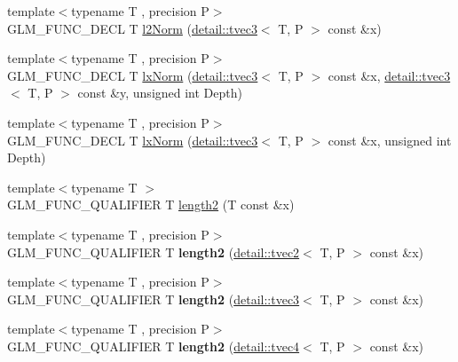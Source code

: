 \begin{DoxyCompactItemize}
\item 
{\footnotesize template$<$typename T , precision P$>$ }\\G\+L\+M\+\_\+\+F\+U\+N\+C\+\_\+\+D\+E\+CL T \hyperlink{group__gtx__norm_gacdfd8d645b91db95a191a1294226571b}{l2\+Norm} (\hyperlink{structglm_1_1detail_1_1tvec3}{detail\+::tvec3}$<$ T, P $>$ const \&x)
\item 
{\footnotesize template$<$typename T , precision P$>$ }\\G\+L\+M\+\_\+\+F\+U\+N\+C\+\_\+\+D\+E\+CL T \hyperlink{group__gtx__norm_gaf2ec2a2b14e0d4ddfadd5b1a98ed9799}{lx\+Norm} (\hyperlink{structglm_1_1detail_1_1tvec3}{detail\+::tvec3}$<$ T, P $>$ const \&x, \hyperlink{structglm_1_1detail_1_1tvec3}{detail\+::tvec3}$<$ T, P $>$ const \&y, unsigned int Depth)
\item 
{\footnotesize template$<$typename T , precision P$>$ }\\G\+L\+M\+\_\+\+F\+U\+N\+C\+\_\+\+D\+E\+CL T \hyperlink{group__gtx__norm_ga7f76252fa0266db34865dba8a8c0f7d6}{lx\+Norm} (\hyperlink{structglm_1_1detail_1_1tvec3}{detail\+::tvec3}$<$ T, P $>$ const \&x, unsigned int Depth)
\item 
{\footnotesize template$<$typename T $>$ }\\G\+L\+M\+\_\+\+F\+U\+N\+C\+\_\+\+Q\+U\+A\+L\+I\+F\+I\+ER T \hyperlink{group__gtx__norm_ga08c670024cd230e22f8b853f185ff533}{length2} (T const \&x)
\item 
{\footnotesize template$<$typename T , precision P$>$ }\\G\+L\+M\+\_\+\+F\+U\+N\+C\+\_\+\+Q\+U\+A\+L\+I\+F\+I\+ER T {\bfseries length2} (\hyperlink{structglm_1_1detail_1_1tvec2}{detail\+::tvec2}$<$ T, P $>$ const \&x)\hypertarget{namespaceglm_ac3840f0dc5178071efeb9c431dcdf230}{}\label{namespaceglm_ac3840f0dc5178071efeb9c431dcdf230}

\item 
{\footnotesize template$<$typename T , precision P$>$ }\\G\+L\+M\+\_\+\+F\+U\+N\+C\+\_\+\+Q\+U\+A\+L\+I\+F\+I\+ER T {\bfseries length2} (\hyperlink{structglm_1_1detail_1_1tvec3}{detail\+::tvec3}$<$ T, P $>$ const \&x)\hypertarget{namespaceglm_acd4e0b768adff0710d0c59aed356d837}{}\label{namespaceglm_acd4e0b768adff0710d0c59aed356d837}

\item 
{\footnotesize template$<$typename T , precision P$>$ }\\G\+L\+M\+\_\+\+F\+U\+N\+C\+\_\+\+Q\+U\+A\+L\+I\+F\+I\+ER T {\bfseries length2} (\hyperlink{structglm_1_1detail_1_1tvec4}{detail\+::tvec4}$<$ T, P $>$ const \&x)\hypertarget{namespaceglm_a5b1d668b8ffd3ec2423ef18e260c2cce}{}\label{namespaceglm_a5b1d668b8ffd3ec2423ef18e260c2cce}


\end{DoxyCompactItemize}
